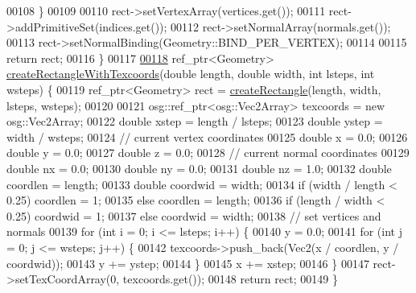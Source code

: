 \begin{DoxyCode}
00108         \}
00109 
00110         rect->setVertexArray(vertices.get());
00111         rect->addPrimitiveSet(indices.get());
00112         rect->setNormalArray(normals.get());
00113         rect->setNormalBinding(Geometry::BIND\_PER\_VERTEX);
00114          
00115         \textcolor{keywordflow}{return} rect;
00116     \}
00117 
\hypertarget{_util_functions_8cpp_source_l00118}{}\hyperlink{namespacebrtr_a4e91424e74398a612c38a920df0577ef}{00118}     ref\_ptr<Geometry> \hyperlink{namespacebrtr_a4e91424e74398a612c38a920df0577ef}{createRectangleWithTexcoords}(\textcolor{keywordtype}{double} length, \textcolor{keywordtype}{double} width,
       \textcolor{keywordtype}{int} lsteps, \textcolor{keywordtype}{int} wsteps) \{
00119         ref\_ptr<Geometry> rect = \hyperlink{namespacebrtr_a793c6ef7f57632fc5ac280b94f60dd65}{createRectangle}(length,  width,  lsteps,  wsteps);
00120 
00121         osg::ref\_ptr<osg::Vec2Array> texcoords = \textcolor{keyword}{new} osg::Vec2Array;
00122         \textcolor{keywordtype}{double} xstep = length / lsteps;
00123         \textcolor{keywordtype}{double} ystep = width / wsteps;
00124         \textcolor{comment}{// current vertex coordinates}
00125         \textcolor{keywordtype}{double} x = 0.0;
00126         \textcolor{keywordtype}{double} y = 0.0;
00127         \textcolor{keywordtype}{double} z = 0.0;
00128         \textcolor{comment}{//  current normal coordinates}
00129         \textcolor{keywordtype}{double} nx = 0.0;
00130         \textcolor{keywordtype}{double} ny = 0.0;
00131         \textcolor{keywordtype}{double} nz = 1.0;
00132         \textcolor{keywordtype}{double} coordlen = length;
00133         \textcolor{keywordtype}{double} coordwid = width;
00134         \textcolor{keywordflow}{if} (width / length < 0.25) coordlen = 1;
00135         \textcolor{keywordflow}{else} coordlen = length;
00136         \textcolor{keywordflow}{if} (length / width < 0.25) coordwid = 1;
00137         \textcolor{keywordflow}{else} coordwid = width;
00138         \textcolor{comment}{// set vertices and normals}
00139         \textcolor{keywordflow}{for} (\textcolor{keywordtype}{int} i = 0; i <= lsteps; i++) \{
00140             y = 0.0;
00141             \textcolor{keywordflow}{for} (\textcolor{keywordtype}{int} j = 0; j <= wsteps; j++) \{
00142                 texcoords->push\_back(Vec2(x / coordlen, y / coordwid));
00143                 y += ystep;
00144             \}
00145             x += xstep;
00146         \}
00147         rect->setTexCoordArray(0, texcoords.get());
00148         \textcolor{keywordflow}{return} rect;
00149     \}

\end{DoxyCode}
